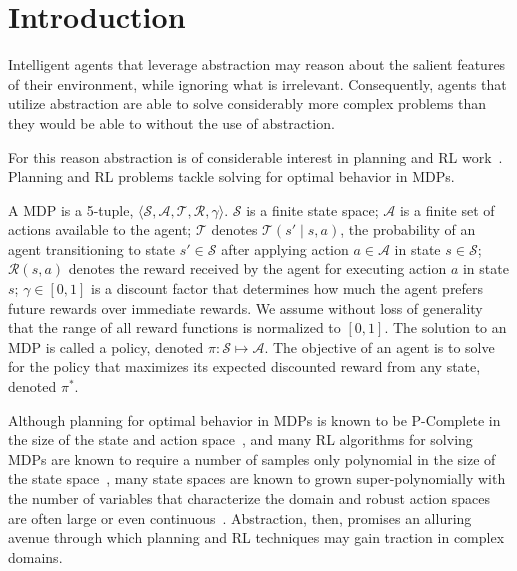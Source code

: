 \section{Introduction}
\label{sec:intro}

Intelligent agents that leverage abstraction may reason about the salient features of their environment, while ignoring what is irrelevant. Consequently, agents that utilize abstraction are able to solve considerably more complex problems than they would be able to without the use of abstraction. 

For this reason abstraction is of considerable interest in planning and \ac{RL} work~. Planning and \ac{RL} problems tackle solving for optimal behavior in \acp{MDP}. 

A \ac{MDP} is a 5-tuple, $\langle \mathcal{S}, \mathcal{A}, \mathcal{T}, \mathcal{R}, \gamma \rangle$. $\mathcal{S}$ is a finite state space; $\mathcal{A}$ is a finite set of actions available to the agent; $\mathcal{T}$ denotes $\mathcal{T}(s' \mid s,a)$, the probability of an agent transitioning to state $s' \in \mathcal{S}$ after applying action $a \in \mathcal{A}$ in state $s \in \mathcal{S}$; $\mathcal{R}(s,a)$ denotes the reward received by the agent for executing action $a$ in state $s$; $\gamma \in [0, 1]$ is a discount factor that determines how much the agent prefers future rewards over immediate rewards. We assume without loss of generality that the range of all reward functions is normalized to $[0,1]$. The solution to an \ac{MDP} is called a policy, denoted $\pi: \mathcal{S} \mapsto \mathcal{A}$. The objective of an agent is to solve for the policy that maximizes its expected discounted reward from any state, denoted $\pi^*$. 

 Although planning for optimal behavior in \acp{MDP} is known to be P-Complete in the size of the state and action space~\cite{papadimitriou1987complexity,littman1995complexity}, and many \ac{RL} algorithms for solving \acp{MDP} are known to require a number of samples only polynomial in the size of the state space~\cite{strehl2009reinforcement}, many state spaces are known to grown super-polynomially with the number of variables that characterize the domain \cite{abel2015goal} and robust action spaces are often large or even continuous~\cite{antos2008fitted,konidaris2014constructing}. Abstraction, then, promises an alluring avenue through which planning and \ac{RL} techniques may gain traction in complex domains. 

